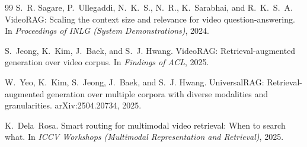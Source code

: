 \documentclass{article}
\begin{document}
\begin{thebibliography}{99}
S.~R. Sagare, P.~Ullegaddi, N.~K.~S., N.~R., K.~Sarabhai, and R.~K.~S.~A.
\newblock VideoRAG: Scaling the context size and relevance for video question-answering.
\newblock In \emph{Proceedings of INLG (System Demonstrations)}, 2024.

S.~Jeong, K.~Kim, J.~Baek, and S.~J. Hwang.
\newblock VideoRAG: Retrieval-augmented generation over video corpus.
\newblock In \emph{Findings of ACL}, 2025.

W.~Yeo, K.~Kim, S.~Jeong, J.~Baek, and S.~J. Hwang.
\newblock UniversalRAG: Retrieval-augmented generation over multiple corpora with diverse modalities and granularities.
\newblock arXiv:2504.20734, 2025.

K.~Dela~Rosa.
\newblock Smart routing for multimodal video retrieval: When to search what.
\newblock In \emph{ICCV Workshops (Multimodal Representation and Retrieval)}, 2025.

\end{thebibliography}
\end{document}
